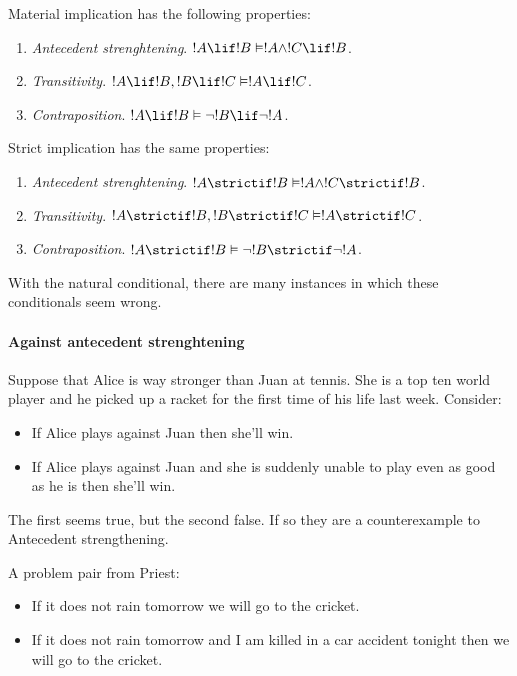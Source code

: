 \documentclass[../../../include/open-logic-section]{subfiles}
\begin{document}


Material implication has the following properties:

\begin{enumerate}
	\item \emph{Antecedent strenghtening}. $!A \lif !B \Entails !A \land !C \lif !B$.
	\item \emph{Transitivity}. $!A \lif !B, !B \lif !C \Entails !A \lif !C$.
	\item \emph{Contraposition}. $!A \lif !B \Entails \lnot !B \lif \lnot !A$.
\end{enumerate}

Strict implication has the same properties:

\begin{enumerate}
	\item \emph{Antecedent strenghtening}. $!A \strictif !B \Entails !A \land !C \strictif !B$.
	\item \emph{Transitivity}. $!A \strictif !B, !B \strictif !C \Entails !A \strictif !C$.
	\item \emph{Contraposition}. $!A \strictif !B \Entails \lnot !B \strictif \lnot !A$.
\end{enumerate}

With the natural conditional, there are many instances in which these conditionals seem wrong.

\paragraph*{Against antecedent strenghtening}

Suppose that Alice is way stronger than Juan at tennis. She is a top ten world player and he picked up a racket for the first time of his life last week. Consider:

\begin{itemize}
	\item If Alice plays against Juan then she'll win.
	\item If Alice plays against Juan and she is suddenly unable to play even as good as he is then she'll win.
\end{itemize}

The first seems true, but the second false. If so they are a counterexample to Antecedent strengthening. 

A problem pair from Priest:

\begin{itemize}
	\item If it does not rain tomorrow we will go to the cricket. 
	\item If it does not rain tomorrow and I am killed in a car accident tonight then we will go to the cricket.
\end{itemize}
\end{document}

